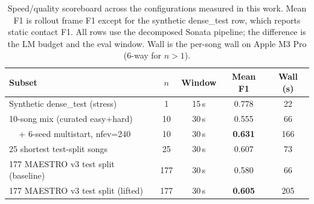 \begin{table}[t]
\centering
\caption{Speed/quality scoreboard across the configurations measured in this
work. Mean F1 is rollout frame F1 except for the synthetic dense\_test row,
which reports static contact F1. All rows use the decomposed Sonata
pipeline; the difference is the LM budget and the eval window. Wall is the
per-song wall on Apple M3 Pro (6-way for $n>1$).}
\label{tab:scoreboard}
\begin{tabular}{lcccc}
\toprule
Subset                              & $n$  & Window & Mean F1 & Wall (s) \\
\midrule
Synthetic dense\_test (stress)      & 1    & 15\,s & 0.778  & 22  \\
10-song mix (curated easy+hard)     & 10   & 30\,s & 0.555  & 66  \\
$\;\;\;$ + 6-seed multistart, nfev=240 & 10 & 30\,s & \textbf{0.631} & 166 \\
25 shortest test-split songs         & 25  & 30\,s & 0.607  & 73  \\
177 MAESTRO v3 test split (baseline) & 177 & 30\,s & 0.580  & 66  \\
177 MAESTRO v3 test split (lifted)   & 177 & 30\,s & \textbf{0.605} & 205 \\
\bottomrule
\end{tabular}
\end{table}


